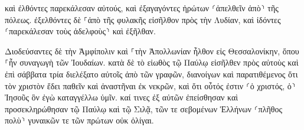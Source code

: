 \documentclass{openreader}
\begin{document}
καὶ ἐλθόντες παρεκάλεσαν αὐτούς, καὶ ἐξαγαγόντες ἠρώτων ⸂ἀπελθεῖν ἀπὸ⸃ τῆς πόλεως. 
ἐξελθόντες δὲ ⸀ἀπὸ τῆς φυλακῆς εἰσῆλθον πρὸς τὴν Λυδίαν, καὶ ἰδόντες ⸂παρεκάλεσαν τοὺς ἀδελφοὺς⸃ καὶ ἐξῆλθαν. 

Διοδεύσαντες δὲ τὴν Ἀμφίπολιν καὶ ⸀τὴν Ἀπολλωνίαν ἦλθον εἰς Θεσσαλονίκην, ὅπου ⸀ἦν συναγωγὴ τῶν Ἰουδαίων. 
κατὰ δὲ τὸ εἰωθὸς τῷ Παύλῳ εἰσῆλθεν πρὸς αὐτοὺς καὶ ἐπὶ σάββατα τρία διελέξατο αὐτοῖς ἀπὸ τῶν γραφῶν, 
διανοίγων καὶ παρατιθέμενος ὅτι τὸν χριστὸν ἔδει παθεῖν καὶ ἀναστῆναι ἐκ νεκρῶν, καὶ ὅτι οὗτός ἐστιν ⸂ὁ χριστός, ὁ⸃ Ἰησοῦς ὃν ἐγὼ καταγγέλλω ὑμῖν. 
καί τινες ἐξ αὐτῶν ἐπείσθησαν καὶ προσεκληρώθησαν τῷ Παύλῳ καὶ τῷ Σιλᾷ, τῶν τε σεβομένων Ἑλλήνων ⸂πλῆθος πολὺ⸃ γυναικῶν τε τῶν πρώτων οὐκ ὀλίγαι. 
\end{document}

